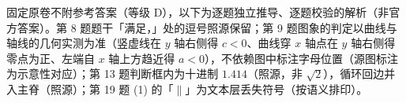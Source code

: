 
\begin{gktip}
固定原卷不附参考答案（等级 D），以下为逐题独立推导、逐题校验的解析（非官方答案）。第 8 题题干「满足，」处的逗号照源保留；第 9 题图象的判定以曲线与轴线的几何实测为准（竖虚线在 \(y\) 轴右侧得 \(c<0\)、曲线穿 \(x\) 轴点在 \(y\) 轴右侧得零点为正、左端自 \(x\) 轴上方趋近得 \(a<0\)），不依赖图中标注字母位置（源图标注为示意性对应）；第 13 题判断框内为十进制 \(1.414\)（照源，非 \(\sqrt{2}\)），循环回边并入主脊（照源）；第 19 题 (1) 的「\(\parallel\)」为文本层丢失符号（按语义排印）。
\end{gktip}

